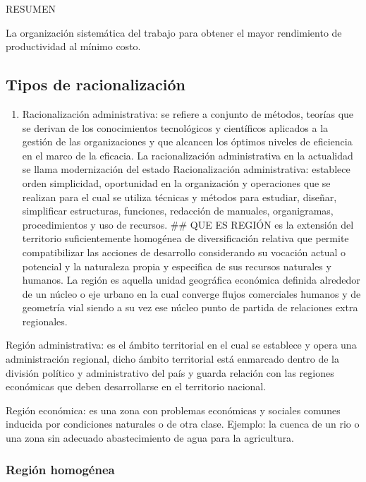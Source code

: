 \documentclass[
  letterpaper,
  DIV=11,
  numbers=noendperiod]{scrartcl}
\providecommand{\tightlist}{%
  \setlength{\itemsep}{0pt}\setlength{\parskip}{0pt}}\usepackage{longtable,booktabs,array}
\begin{document}
RESUMEN

La organización sistemática del trabajo para obtener el mayor
rendimiento de productividad al mínimo costo.

\hypertarget{tipos-de-racionalizaciuxf3n}{%
\subsection{Tipos de
racionalización}\label{tipos-de-racionalizaciuxf3n}}

\begin{enumerate}
\def\labelenumi{\arabic{enumi}.}
\tightlist
\item
  Racionalización administrativa: se refiere a conjunto de métodos,
  teorías que se derivan de los conocimientos tecnológicos y científicos
  aplicados a la gestión de las organizaciones y que alcancen los
  óptimos niveles de eficiencia en el marco de la eficacia. La
  racionalización administrativa en la actualidad se llama modernización
  del estado Racionalización administrativa: establece orden
  simplicidad, oportunidad en la organización y operaciones que se
  realizan para el cual se utiliza técnicas y métodos para estudiar,
  diseñar, simplificar estructuras, funciones, redacción de manuales,
  organigramas, procedimientos y uso de recursos. \#\# QUE ES REGIÓN es
  la extensión del territorio suficientemente homogénea de
  diversificación relativa que permite compatibilizar las acciones de
  desarrollo considerando su vocación actual o potencial y la naturaleza
  propia y especifica de sus recursos naturales y humanos. La región es
  aquella unidad geográfica económica definida alrededor de un núcleo o
  eje urbano en la cual converge flujos comerciales humanos y de
  geometría vial siendo a su vez ese núcleo punto de partida de
  relaciones extra regionales.
\end{enumerate}

Región administrativa: es el ámbito territorial en el cual se establece
y opera una administración regional, dicho ámbito territorial está
enmarcado dentro de la división político y administrativo del país y
guarda relación con las regiones económicas que deben desarrollarse en
el territorio nacional.

Región económica: es una zona con problemas económicas y sociales
comunes inducida por condiciones naturales o de otra clase. Ejemplo: la
cuenca de un rio o una zona sin adecuado abastecimiento de agua para la
agricultura.

\hypertarget{regiuxf3n-homoguxe9nea}{%
\subsubsection{Región homogénea}\label{regiuxf3n-homoguxe9nea}}
\end{document}
